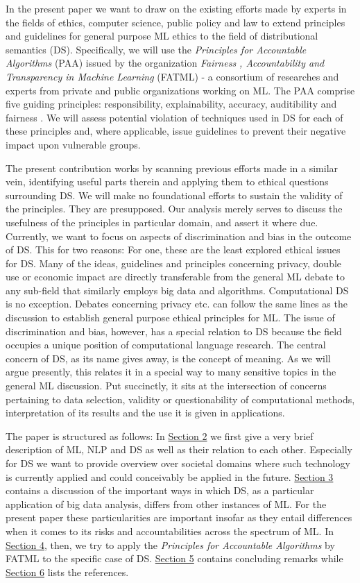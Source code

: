 \documentclass{article}
\begin{document}
In the present paper we want to draw on the existing efforts made by experts in the fields of ethics, computer science, public policy and law to extend principles  and guidelines for general purpose ML ethics to the field of distributional semantics (DS). Specifically, we will use the \emph{Principles for Accountable Algorithms} (PAA) issued by the organization \emph{Fairness , Accountability and Transparency in Machine Learning} (FATML) - a consortium of researches and experts from private and public organizations working on ML. 
The PAA comprise five guiding principles: responsibility, explainability, accuracy, auditibility and fairness \cite{principles}.
We will assess potential violation of techniques used in DS for each of these principles and, where applicable, issue guidelines to prevent their negative impact upon vulnerable groups. 

The present contribution works by scanning previous efforts made in a similar vein, identifying useful parts therein and applying them to ethical questions surrounding DS. We will make no foundational efforts to sustain the validity of the principles. They are presupposed. Our analysis merely serves to discuss the usefulness of the principles in particular domain, and assert it where due.
Currently, we want to focus on aspects of discrimination and bias in the outcome of DS. This for two reasons: For one, these are the least explored ethical issues for DS. Many of the ideas, guidelines and principles concerning privacy, double use or economic impact are directly transferable from the general ML debate to any sub-field that similarly employs big data and algorithms. Computational DS is no exception. Debates concerning privacy etc. can follow the same lines as the discussion to establish general purpose ethical principles for ML. The issue of discrimination and bias, however, has a special relation to DS because the field occupies a unique position of computational language research. The central concern of DS, as its name gives away, is the concept of meaning. As we will argue presently, this relates it in a special way to many sensitive topics in the general ML discussion. Put succinctly, it sits at the intersection of concerns pertaining to data selection, validity or questionability of computational methods, interpretation of its results and the use it is given in applications.

The paper is structured as follows: In \hyperlink{sec2}{Section 2} we first give a very brief description of ML, NLP and DS as well as their relation to each other. Especially for DS we want to provide overview over societal domains where such technology is currently applied and could conceivably be applied in the future. \hyperlink{sec3}{Section 3} contains a discussion of the important ways in which DS, as a particular application of big data analysis, differs from other instances of ML. For the present paper these particularities are important insofar as they entail differences when it comes to its risks and accountabilities across the spectrum of ML. In \hyperlink{sec4}{Section 4}, then, we try to apply the \emph{Principles for Accountable Algorithms} by FATML to the specific case of DS. \hyperlink{sec5}{Section 5} contains concluding remarks while \hyperlink{sec6}{Section 6} lists the references.
\end{document}
